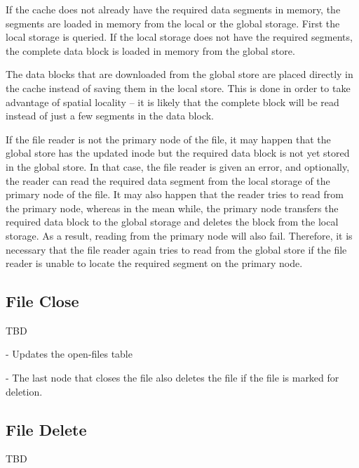 \documentclass[]{article}
\begin{document}
If the cache does not already have the required data segments in memory,
the segments are loaded in memory from the local or the global storage.  First
the local storage is queried. If the local storage does not have the required
segments, the complete data block is loaded in memory from the global store.

The data blocks that are downloaded from the global store are placed directly
in the cache instead of saving them in the local store. This is done in order
to take advantage of spatial locality -- it is likely that the complete
block will be read instead of just a few segments in the data block.


If the file reader is not the primary node of the file, it may happen that
the global store has the updated inode but the required data block is not yet
stored in the global store. In that case, the file reader is given an error,
and optionally, the reader can read the required data segment from the local
storage of the primary node of the file. It may also happen that the reader
tries to read from the primary node, whereas in the mean while, the primary node 
transfers the required data block to the global storage and deletes the
block from the local storage. As a result, reading from the primary node
will also fail. Therefore, it is necessary that the file reader
again tries to read from the global store if the file reader is unable to
locate the required segment on the primary node. 




%
%
%

\subsection{File Close}


TBD

- Updates the open-files table

- The last node that closes the file also deletes the file if the file is
 marked for deletion.


\subsection{File Delete}

TBD
\end{document}
